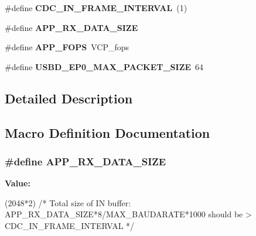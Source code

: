 \begin{DoxyCompactItemize}
\item 
\hypertarget{group__USB__VCP__Class__Layer__Parameter_ga099a3340ca033455c98d38473ec24200}{\#define {\bfseries C\-D\-C\-\_\-\-I\-N\-\_\-\-F\-R\-A\-M\-E\-\_\-\-I\-N\-T\-E\-R\-V\-A\-L}~(1)}\label{group__USB__VCP__Class__Layer__Parameter_ga099a3340ca033455c98d38473ec24200}

\item 
\#define {\bfseries A\-P\-P\-\_\-\-R\-X\-\_\-\-D\-A\-T\-A\-\_\-\-S\-I\-Z\-E}
\item 
\hypertarget{group__USB__VCP__Class__Layer__Parameter_ga98266e1ca5d5d6e494fff6769e307876}{\#define {\bfseries A\-P\-P\-\_\-\-F\-O\-P\-S}~V\-C\-P\-\_\-fops}\label{group__USB__VCP__Class__Layer__Parameter_ga98266e1ca5d5d6e494fff6769e307876}

\item 
\hypertarget{group__USB__VCP__Class__Layer__Parameter_ga54ff86730eb34d583dbf4e4b5850eb11}{\#define {\bfseries U\-S\-B\-D\-\_\-\-E\-P0\-\_\-\-M\-A\-X\-\_\-\-P\-A\-C\-K\-E\-T\-\_\-\-S\-I\-Z\-E}~64}\label{group__USB__VCP__Class__Layer__Parameter_ga54ff86730eb34d583dbf4e4b5850eb11}

\end{DoxyCompactItemize}


\subsection{Detailed Description}


\subsection{Macro Definition Documentation}
\hypertarget{group__USB__VCP__Class__Layer__Parameter_gaf3db03a3d03a80e1ec7a0a9c470d9692}{
\subsubsection[{A\-P\-P\-\_\-\-R\-X\-\_\-\-D\-A\-T\-A\-\_\-\-S\-I\-Z\-E}]{\setlength{\rightskip}{0pt plus 5cm}\#define A\-P\-P\-\_\-\-R\-X\-\_\-\-D\-A\-T\-A\-\_\-\-S\-I\-Z\-E}}\label{group__USB__VCP__Class__Layer__Parameter_gaf3db03a3d03a80e1ec7a0a9c470d9692}
{\bfseries Value\-:}
\begin{DoxyCode}
(2048*2) \textcolor{comment}{/* Total size of IN buffer:}
\textcolor{comment}{                                                APP\_RX\_DATA\_SIZE*8/MAX\_BAUDARATE*1000 should be >
       CDC\_IN\_FRAME\_INTERVAL */}
\end{DoxyCode}
